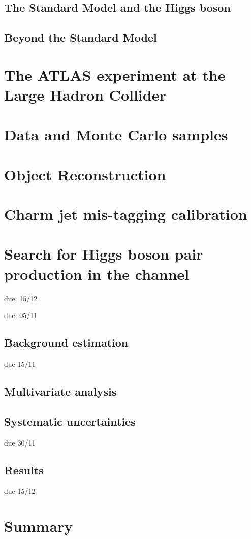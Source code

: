 \documentclass[twoside,11pt]{report}
\begin{document}
\section{The Standard Model and the Higgs boson}
\section{Beyond the Standard Model}
\large
\chapter{The ATLAS experiment at the Large Hadron Collider}


\chapter{Data and Monte Carlo samples}
\chapter{Object Reconstruction}



 
\chapter{Charm jet mis-tagging calibration}





\large
\chapter{Search for Higgs boson pair production in the \bbttlh channel}
\label{sec:search for dihiggs}
due: 15/12

% 


due: 05/11
\section{Background estimation}

due 15/11
\section{Multivariate analysis}
\section{Systematic uncertainties}
due 30/11
\section{Results}
due 15/12

\chapter{Summary}

\printbibliography
\appendix

\end{document}
